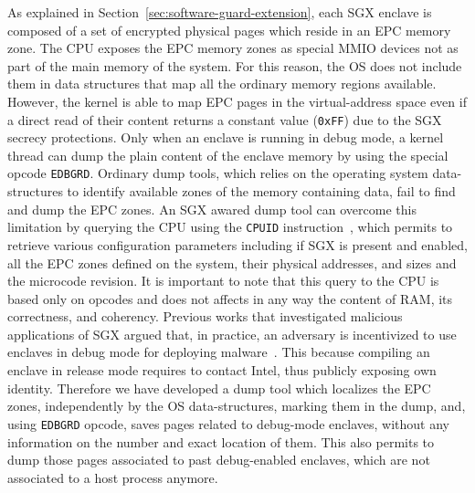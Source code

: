 As explained in Section~\ref{sec:software-guard-extension}, each SGX enclave is 
composed of a set of encrypted physical pages which reside in an EPC memory 
zone. The CPU exposes the EPC memory zones as special MMIO devices not as part 
of the main memory of the system. For this reason, the OS does not include them 
in data structures that map all the ordinary memory regions available. However, 
the kernel is able to map EPC pages in the virtual-address space even if a 
direct read of their content returns a constant value (\ie \texttt{0xFF}) due 
to the SGX secrecy protections. Only when an enclave is running in debug mode, 
a kernel thread can dump the plain content of the enclave memory by using the 
special opcode \texttt{EDBGRD}. Ordinary dump tools, which relies on the 
operating system data-structures to identify available zones of the memory 
containing data, fail to find and dump the EPC zones. An SGX awared dump tool 
can overcome this limitation by querying
the CPU using the \texttt{CPUID} instruction~\citep{intel-developer-guide}, 
which permits to retrieve various configuration parameters including if SGX is 
present and enabled, all the EPC zones
defined on the system, their physical addresses, and sizes and the microcode
revision. It is important to note that this query to the CPU is based only on
opcodes and does not affects in any way the content of RAM, its
correctness, and coherency. 
Previous works that investigated malicious applications of SGX argued that, in 
practice, an adversary is incentivized to use enclaves in debug mode for 
deploying malware~\citep{zhang2018memory}.
This because compiling an enclave in release mode requires to contact 
Intel, thus publicly exposing own identity.
Therefore we have developed a dump
tool which localizes the EPC zones, independently by the OS data-structures, 
marking them in the dump, and,
using \texttt{EDBGRD} opcode, saves pages related to debug-mode enclaves, 
without any information
on the number and exact location of them. This also permits to dump those
pages associated to past debug-enabled enclaves, which are not associated 
to a host process anymore.



